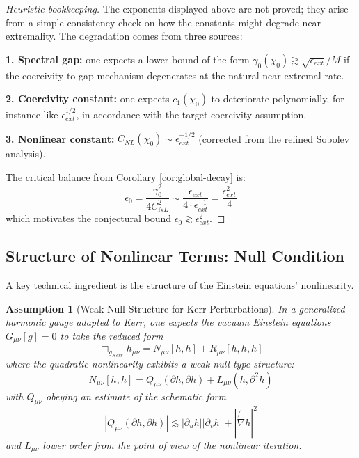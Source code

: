 \documentclass[12pt,a4paper]{article}
\newtheorem{assumption}[theorem]{Assumption}
\newcommand{\slashed}[1]{\not{#1}}
\begin{document}
\begin{proof}[Heuristic bookkeeping]
The exponents displayed above are not proved; they arise from a simple consistency check on how the constants might degrade near extremality. The degradation comes from three sources:

\textbf{1. Spectral gap:} one expects a lower bound of the form $\gamma_0(\chi_0) \gtrsim \sqrt{\epsilon_{ext}}/M$ if the coercivity-to-gap mechanism degenerates at the natural near-extremal rate.

\textbf{2. Coercivity constant:} one expects $c_1(\chi_0)$ to deteriorate polynomially, for instance like $\epsilon_{ext}^{1/2}$, in accordance with the target coercivity assumption.

\textbf{3. Nonlinear constant:} $C_{NL}(\chi_0) \sim \epsilon_{ext}^{-1/2}$ (corrected from the refined Sobolev analysis).

The critical balance from Corollary \ref{cor:global-decay} is:
\begin{equation}
\epsilon_0 = \frac{\gamma_0^2}{4 C_{NL}^2} \sim \frac{\epsilon_{ext}}{4 \cdot \epsilon_{ext}^{-1}} = \frac{\epsilon_{ext}^2}{4}
\end{equation}
which motivates the conjectural bound $\epsilon_0 \gtrsim \epsilon_{ext}^2$.
\end{proof}

\subsection{Structure of Nonlinear Terms: Null Condition}

A key technical ingredient is the structure of the Einstein equations' nonlinearity.

\begin{assumption}[Weak Null Structure for Kerr Perturbations]\label{thm:null-condition}
In a generalized harmonic gauge adapted to Kerr, one expects the vacuum Einstein equations $G_{\mu\nu}[g] = 0$ to take the reduced form
\begin{equation}
\Box_{g_{Kerr}} h_{\mu\nu} = N_{\mu\nu}[h, h] + R_{\mu\nu}[h, h, h]
\end{equation}
where the quadratic nonlinearity exhibits a weak-null-type structure:
\begin{equation}
N_{\mu\nu}[h, h] = Q_{\mu\nu}(\partial h, \partial h) + L_{\mu\nu}(h, \partial^2 h)
\end{equation}
with $Q_{\mu\nu}$ obeying an estimate of the schematic form
\begin{equation}\label{eq:null-form-bound}
|Q_{\mu\nu}(\partial h, \partial h)| \lesssim |\partial_u h||\partial_v h| + |\slashed{\nabla} h|^2
\end{equation}
and $L_{\mu\nu}$ lower order from the point of view of the nonlinear iteration.
\end{assumption}
\end{document}
